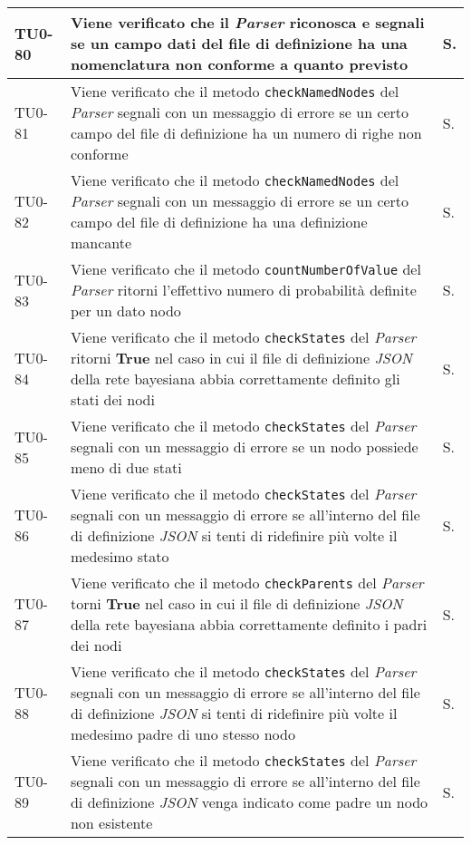 \begin{longtable}{|C{.15\textwidth}|m{.65\textwidth}|C{.20\textwidth}|}
\hline
{}TU0-80 & Viene verificato che il \textit{Parser} riconosca e segnali se un campo dati del file di definizione ha una nomenclatura non conforme a quanto previsto & S.\\
\hline
TU0-81 & Viene verificato che il metodo \texttt{checkNamedNodes} del \textit{Parser} segnali con un messaggio di errore se un certo campo del file di definizione ha un numero di righe non conforme & S.\\
\hline
{}TU0-82 & Viene verificato che il metodo \texttt{checkNamedNodes} del \textit{Parser} segnali con un messaggio di errore se un certo campo del file di definizione ha una definizione mancante & S.\\
\hline
TU0-83 & Viene verificato che il metodo \texttt{countNumberOfValue} del \textit{Parser} ritorni l'effettivo numero di probabilità definite per un dato nodo & S.\\
\hline
{}TU0-84 & Viene verificato che il metodo \texttt{checkStates} del \textit{Parser} ritorni \textbf{True} nel caso in cui il file di definizione \textit{JSON} della rete bayesiana abbia correttamente definito gli stati dei nodi & S.\\
\hline
TU0-85 & Viene verificato che il metodo \texttt{checkStates} del \textit{Parser} segnali con un messaggio di errore se un nodo possiede meno di due stati & S.\\
\hline
{}TU0-86 & Viene verificato che il metodo \texttt{checkStates} del \textit{Parser} segnali con un messaggio di errore se all'interno del file di definizione \textit{JSON} si tenti di ridefinire più volte il medesimo stato & S.\\
\hline
TU0-87 & Viene verificato che il metodo \texttt{checkParents} del \textit{Parser} torni \textbf{True} nel caso in cui il file di definizione \textit{JSON} della rete bayesiana abbia correttamente definito i padri dei nodi & S.\\
\hline
{}TU0-88 & Viene verificato che il metodo \texttt{checkStates} del \textit{Parser} segnali con un messaggio di errore se all'interno del file di definizione \textit{JSON} si tenti di ridefinire più volte il medesimo padre di uno stesso nodo & S.\\
\hline
TU0-89 & Viene verificato che il metodo \texttt{checkStates} del \textit{Parser} segnali con un messaggio di errore se all'interno del file di definizione \textit{JSON} venga indicato come padre un nodo non esistente & S.\\

\end{longtable}
